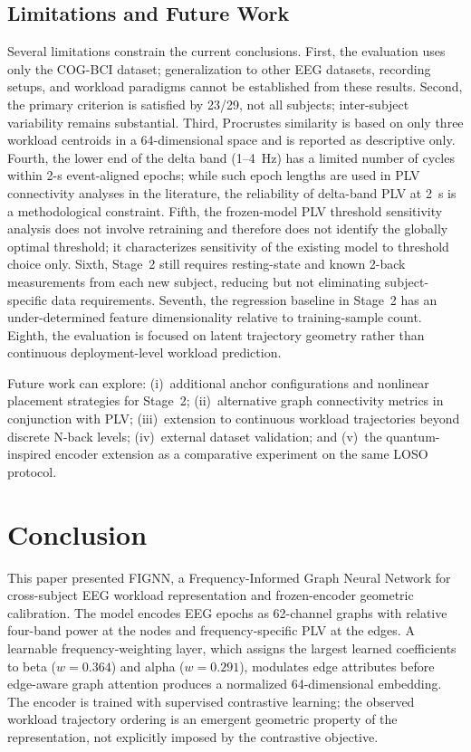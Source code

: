 \documentclass{ieeeaccess}
\begin{document}
\subsection{Limitations and Future Work}
\label{sec:limitations}

Several limitations constrain the current conclusions. First, the evaluation
uses only the COG-BCI dataset; generalization to other EEG datasets, recording
setups, and workload paradigms cannot be established from these results.
Second, the primary criterion is satisfied by 23/29, not all subjects;
inter-subject variability remains substantial. Third, Procrustes similarity
is based on only three workload centroids in a 64-dimensional space and is
reported as descriptive only. Fourth, the lower end of the delta band
(1--4~Hz) has a limited number of cycles within 2-s event-aligned epochs;
while such epoch lengths are used in PLV connectivity analyses in the
literature, the reliability of delta-band PLV at 2~s is a methodological
constraint. Fifth, the frozen-model PLV threshold sensitivity analysis does
not involve retraining and therefore does not identify the globally optimal
threshold; it characterizes sensitivity of the existing model to threshold
choice only. Sixth, Stage~2 still requires resting-state and known 2-back
measurements from each new subject, reducing but not eliminating subject-specific
data requirements. Seventh, the regression baseline in Stage~2 has an
under-determined feature dimensionality relative to training-sample count.
Eighth, the evaluation is focused on latent trajectory geometry rather than
continuous deployment-level workload prediction.

Future work can explore: (i)~additional anchor configurations and nonlinear
placement strategies for Stage~2; (ii)~alternative graph connectivity metrics
in conjunction with PLV; (iii)~extension to continuous workload trajectories
beyond discrete N-back levels; (iv)~external dataset validation; and
(v)~the quantum-inspired encoder extension as a comparative experiment on
the same LOSO protocol.

\section{Conclusion}
\label{sec:conclusion}

This paper presented FIGNN, a Frequency-Informed Graph Neural Network for
cross-subject EEG workload representation and frozen-encoder geometric
calibration. The model encodes EEG epochs as 62-channel graphs with relative
four-band power at the nodes and frequency-specific PLV at the edges. A
learnable frequency-weighting layer, which assigns the largest learned
coefficients to beta ($w=0.364$) and alpha ($w=0.291$), modulates edge
attributes before edge-aware graph attention produces a normalized 64-dimensional
embedding. The encoder is trained with supervised contrastive learning; the
observed workload trajectory ordering is an emergent geometric property of
the representation, not explicitly imposed by the contrastive objective.
\end{document}
